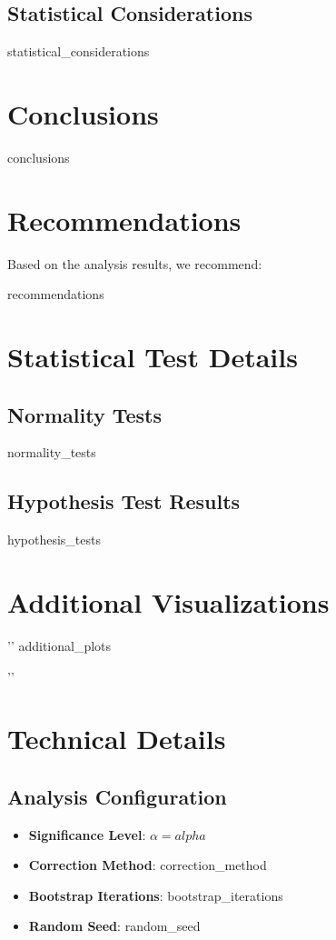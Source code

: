 \documentclass[11pt,a4paper]{article}
\begin{document}
{{{{{{{{{{{{{{{{\subsection{Statistical Considerations}

{{ statistical_considerations }}

\section{Conclusions}

{{ conclusions }}

\section{Recommendations}

Based on the analysis results, we recommend:

{{ recommendations }}

\appendix

\section{Statistical Test Details}

\subsection{Normality Tests}

{{ normality_tests }}

\subsection{Hypothesis Test Results}

{{ hypothesis_tests }}

\section{Additional Visualizations}

{{ '{' }}%
{{ additional_plots }}
{{ '{' }}%

\section{Technical Details}

\subsection{Analysis Configuration}
\begin{itemize}
    \item \textbf{Significance Level}: $\alpha = {{ alpha }}$
    \item \textbf{Correction Method}: {{ correction_method }}
    \item \textbf{Bootstrap Iterations}: {{ bootstrap_iterations }}
    \item \textbf{Random Seed}: {{ random_seed }}
\end{itemize}

}}}}}}}}}}}}}}}}}}
\end{document}
